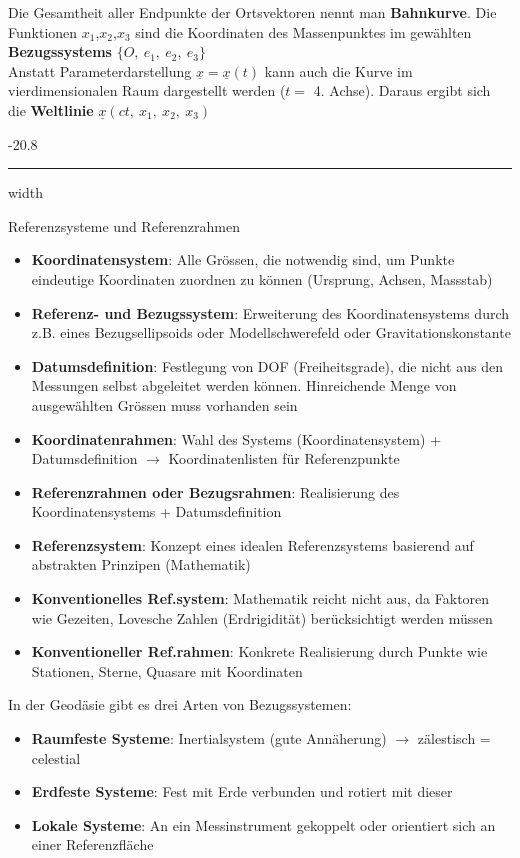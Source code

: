 \documentclass[9pt, landscape, fleqn]{scrartcl}
\makeatletter
\renewcommand{\subsubsection}{\@startsection{subsubsection}{1}{0mm}%
{-2\baselineskip}{0.8\baselineskip}%
{\hrule depth 0.2pt width\columnwidth\vspace*{1.2em}\normalsize\bfseries\rmfamily}}
\makeatother
\begin{document}
\begin{multicols*}{3}
Die Gesamtheit aller Endpunkte der Ortsvektoren nennt man \textbf{Bahnkurve}. Die Funktionen $x_1$,$x_2$,$x_3$ sind die Koordinaten des Massenpunktes im gewählten \textbf{Bezugssystems} $\{O,~e_1,~e_2,~e_3\}$ \\

Anstatt Parameterdarstellung $\underline{x}=\underline{x}(t)$ kann auch die Kurve im vierdimensionalen Raum dargestellt werden ($t =$ 4. Achse). Daraus ergibt sich die \textbf{Weltlinie} $\underline{x}(ct,~x_1,~x_2,~x_3)$

\subsubsection{Referenzsysteme und Referenzrahmen}

\begin{itemize}
    \item \textbf{Koordinatensystem}: Alle Grössen, die notwendig sind, um Punkte eindeutige Koordinaten zuordnen zu können (Ursprung, Achsen, Massstab)
    \item \textbf{Referenz- und Bezugssystem}: Erweiterung des Koordinatensystems durch z.B. eines Bezugsellipsoids oder Modellschwerefeld oder Gravitationskonstante
    \item \textbf{Datumsdefinition}: Festlegung von DOF (Freiheitsgrade), die nicht aus den Messungen selbst abgeleitet werden können. Hinreichende Menge von ausgewählten Grössen muss vorhanden sein 
    \item \textbf{Koordinatenrahmen}: Wahl des Systems (Koordinatensystem) + Datumsdefinition $\rightarrow$ Koordinatenlisten für Referenzpunkte
    \item \textbf{Referenzrahmen oder Bezugsrahmen}: Realisierung des Koordinatensystems + Datumsdefinition
    \item \textbf{Referenzsystem}: Konzept eines idealen Referenzsystems basierend auf abstrakten Prinzipen (Mathematik)
    \item \textbf{Konventionelles Ref.system}: Mathematik reicht nicht aus, da Faktoren wie Gezeiten, Lovesche Zahlen (Erdrigidität) berücksichtigt werden müssen
    \item \textbf{Konventioneller Ref.rahmen}: Konkrete Realisierung durch Punkte wie Stationen, Sterne, Quasare mit Koordinaten
\end{itemize}

In der Geodäsie gibt es drei Arten von Bezugssystemen:

\begin{itemize}
    \item \textbf{Raumfeste Systeme}: Inertialsystem (gute Annäherung) $\rightarrow$ zälestisch = celestial
    \item \textbf{Erdfeste Systeme}: Fest mit Erde verbunden und rotiert mit dieser
    \item \textbf{Lokale Systeme}: An ein Messinstrument gekoppelt oder orientiert sich an einer Referenzfläche
\end{itemize}


\end{multicols*}
\end{document}
